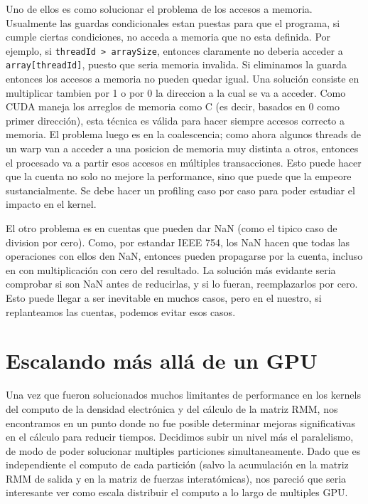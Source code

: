 Uno de ellos es como solucionar el problema de los accesos a memoria.
Usualmente las guardas condicionales estan puestas para que el programa, si cumple ciertas condiciones,
no acceda a memoria que no esta definida. Por ejemplo, si \texttt{threadId > arraySize}, entonces claramente
no deberia acceder a \texttt{array[threadId]}, puesto que seria memoria invalida. Si eliminamos la guarda
entonces los accesos a memoria no pueden quedar igual. Una soluci\'on consiste en multiplicar tambien
por 1 o por 0 la direccion a la cual se va a acceder. Como CUDA maneja los arreglos de memoria
como C (es decir, basados en 0 como primer direcci\'on), esta t\'ecnica es v\'alida para hacer
siempre accesos correcto a memoria. El problema luego es en la coalescencia; como ahora algunos
threads de un warp van a acceder a una posicion de memoria muy distinta a otros, entonces el procesado
va a partir esos accesos en m\'ultiples transacciones. Esto puede hacer que la cuenta no solo no mejore
la performance, sino que puede que la empeore sustancialmente. Se debe hacer un profiling caso
por caso para poder estudiar el impacto en el kernel.

El otro problema es en cuentas que pueden dar NaN (como el tipico caso de division por cero).
Como, por estandar IEEE 754, los NaN hacen que todas las operaciones con ellos den NaN,
entonces pueden propagarse por la cuenta, incluso en con multiplicaci\'on con cero del resultado.
La soluci\'on m\'as evidante seria comprobar si son NaN antes de reducirlas, y si lo fueran, reemplazarlos
por cero. Esto puede llegar a ser inevitable en muchos casos, pero en el nuestro, si replanteamos
las cuentas, podemos evitar esos casos.

\section{Escalando m\'as all\'a de un GPU}
Una vez que fueron solucionados muchos limitantes de performance en los kernels del computo
de la densidad electr\'onica y del c\'alculo de la matriz RMM, nos encontramos en un punto donde
no fue posible determinar mejoras significativas en el c\'alculo para reducir tiempos.
Decidimos subir un nivel m\'as el paralelismo, de modo de poder solucionar multiples particiones
simultaneamente. Dado que es independiente el computo de cada partici\'on (salvo la acumulaci\'on
en la matriz RMM de salida y en la matriz de fuerzas interat\'omicas), nos pareci\'o que seria
interesante ver como escala distribuir el computo a lo largo de multiples GPU.

